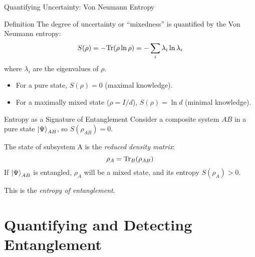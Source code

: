 
\begin{frame}{Quantifying Uncertainty: Von Neumann Entropy}
  \begin{block}{Definition}
    The degree of uncertainty or ``mixedness'' is quantified by the Von Neumann
    entropy:
    \begin{equation}
      S(\rho) = - \mathrm{Tr}(\rho \ln \rho) = - \sum_i \lambda_i \ln \lambda_i
    \end{equation}
    where $\lambda_i$ are the eigenvalues of $\rho$.
    \begin{itemize}[<+->]
      \item For a pure state, $S(\rho) = 0$ (maximal knowledge).
      \item For a maximally mixed state ($\rho=I/d$), $S(\rho) = \ln d$ (minimal knowledge).
    \end{itemize}
  \end{block}
\end{frame}

\begin{frame}
  \begin{alertblock}{Entropy as a Signature of Entanglement}
    Consider a composite system $AB$ in a pure state $\ket{\Psi}_{AB}$, so
    $S(\rho_{AB})=0$.

    \pause

    The state of subsystem A is the \emph{reduced density matrix}:
    \[ \rho_A = \mathrm{Tr}_B(\rho_{AB}) \]
    If $\ket{\Psi}_{AB}$ is entangled, $\rho_A$ will be a mixed state, and its
    entropy \alert{$S(\rho_A) > 0$}.

    \pause

    This is the \emph{entropy of entanglement}.
  \end{alertblock}
\end{frame}


\section{Quantifying and Detecting Entanglement}


